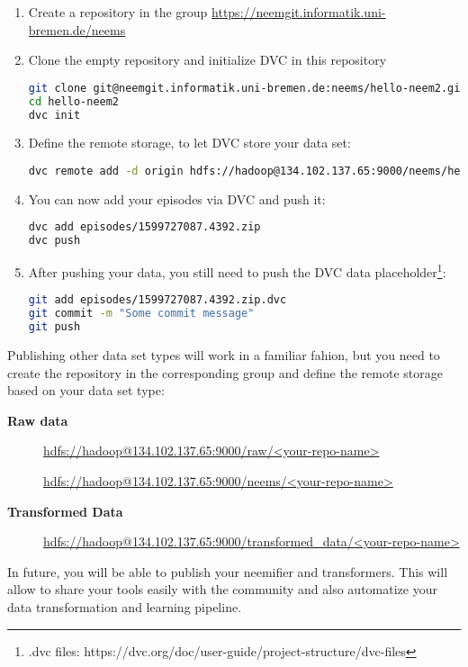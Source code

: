 \begin{enumerate}
	\item Create a repository in the \neem group \url{https://neemgit.informatik.uni-bremen.de/neems}
	\item Clone the empty repository and initialize DVC in this repository
\begin{lstlisting}[language=bash, caption=Initialize DVC using \emph{dvc init}]
git clone git@neemgit.informatik.uni-bremen.de:neems/hello-neem2.git
cd hello-neem2
dvc init
\end{lstlisting}
	\item Define the remote storage, to let DVC store your data set:
\begin{lstlisting}[language=bash, caption=Define remote storage using \emph{dvc remote add}]
dvc remote add -d origin hdfs://hadoop@134.102.137.65:9000/neems/hello-neem2
\end{lstlisting}	
\item You can now add your episodes via DVC and push it:
\begin{lstlisting}[language=bash, caption=Add data and pushing using \emph{dvc add} and \emph{dvc push}]
dvc add episodes/1599727087.4392.zip
dvc push
\end{lstlisting}
\item After pushing your data, you still need to push the DVC data placeholder\footnote{.dvc files: https://dvc.org/doc/user-guide/project-structure/dvc-files}:
\begin{lstlisting}[language=bash, caption=Downloading a \neem using \emph{dvc pull}]
git add episodes/1599727087.4392.zip.dvc
git commit -m "Some commit message"
git push
\end{lstlisting}
\end{enumerate}

Publishing other data set types will work in a familiar fahion, but you need to create the repository in the corresponding group and define the remote storage based on your data set type:
 
\begin{description}
	\item[\textbf{Raw data}]\leavevmode \newline
		\url{hdfs://hadoop@134.102.137.65:9000/raw/<your-repo-name>}
	\item[\textbf{\neems}] \leavevmode \newline
		\url{hdfs://hadoop@134.102.137.65:9000/neems/<your-repo-name>}
	\item[\textbf{Transformed Data}] \leavevmode \newline
		\url{hdfs://hadoop@134.102.137.65:9000/transformed_data/<your-repo-name>}
\end{description}

In future, you will be able to publish your neemifier and transformers.
This will allow to share your tools easily with the community and also automatize your data transformation and learning pipeline.


